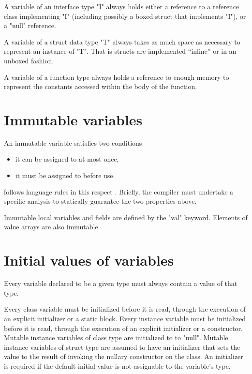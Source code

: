 
A variable of an interface type \xcd"I" always holds either a
reference to a reference class implementing \xcd"I" (including possibly
a boxed struct that implements \xcd"I"), or a \xcd"null"
reference.

A variable of a struct data type \xcd"T"  always takes as much
space as necessary to represent an instance of \xcd"T". That is
structs are implemented ``inline'' or in an unboxed fashion.

A variable of a function type always holds a reference to enough
memory to represent the constants accessed within the body of the
function.

\section{Immutable variables}
\label{FinalVariables}
An immutable variable satisfies two conditions: 
\begin{itemize}
\item it can be assigned to at most once, 
\item it must be assigned to before use. 
\end{itemize}

\Xten{} follows \java{} language rules in this respect \cite[\S
4.5.4,8.3.1.2,16]{jls2}. Briefly, the compiler must undertake a
specific analysis to statically guarantee the two properties above.

Immutable local variables and fields are defined by the \xcd"val"
keyword.  Elements of value arrays are also immutable.


\section{Initial values of variables}
\label{NullaryConstructor}

Every variable declared to be a given type must always contain a value of that type.

Every class variable must be initialized before it is read, through
the execution of an explicit initializer or a static block. Every
instance variable must be initialized before it is read, through the
execution of an explicit initializer or a constructor.
Mutable instance variables of class type are initialized to 
to \xcd"null".
Mutable instance variables of struct type are 
assumed to have an initializer that sets the value to the
result of invoking the nullary constructor on the class. 
An initializer is required if the default initial value is not
assignable to the variable's type.

